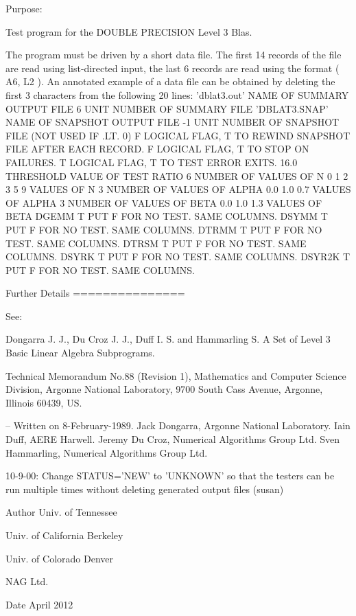 \begin{DoxyParagraph}{Purpose\+: }
\begin{DoxyVerb} Test program for the DOUBLE PRECISION Level 3 Blas.

 The program must be driven by a short data file. The first 14 records
 of the file are read using list-directed input, the last 6 records
 are read using the format ( A6, L2 ). An annotated example of a data
 file can be obtained by deleting the first 3 characters from the
 following 20 lines:
 'dblat3.out'      NAME OF SUMMARY OUTPUT FILE
 6                 UNIT NUMBER OF SUMMARY FILE
 'DBLAT3.SNAP'     NAME OF SNAPSHOT OUTPUT FILE
 -1                UNIT NUMBER OF SNAPSHOT FILE (NOT USED IF .LT. 0)
 F        LOGICAL FLAG, T TO REWIND SNAPSHOT FILE AFTER EACH RECORD.
 F        LOGICAL FLAG, T TO STOP ON FAILURES.
 T        LOGICAL FLAG, T TO TEST ERROR EXITS.
 16.0     THRESHOLD VALUE OF TEST RATIO
 6                 NUMBER OF VALUES OF N
 0 1 2 3 5 9       VALUES OF N
 3                 NUMBER OF VALUES OF ALPHA
 0.0 1.0 0.7       VALUES OF ALPHA
 3                 NUMBER OF VALUES OF BETA
 0.0 1.0 1.3       VALUES OF BETA
 DGEMM  T PUT F FOR NO TEST. SAME COLUMNS.
 DSYMM  T PUT F FOR NO TEST. SAME COLUMNS.
 DTRMM  T PUT F FOR NO TEST. SAME COLUMNS.
 DTRSM  T PUT F FOR NO TEST. SAME COLUMNS.
 DSYRK  T PUT F FOR NO TEST. SAME COLUMNS.
 DSYR2K T PUT F FOR NO TEST. SAME COLUMNS.

 Further Details
 ===============

 See:

    Dongarra J. J., Du Croz J. J., Duff I. S. and Hammarling S.
    A Set of Level 3 Basic Linear Algebra Subprograms.

    Technical Memorandum No.88 (Revision 1), Mathematics and
    Computer Science Division, Argonne National Laboratory, 9700
    South Cass Avenue, Argonne, Illinois 60439, US.

 -- Written on 8-February-1989.
    Jack Dongarra, Argonne National Laboratory.
    Iain Duff, AERE Harwell.
    Jeremy Du Croz, Numerical Algorithms Group Ltd.
    Sven Hammarling, Numerical Algorithms Group Ltd.

    10-9-00:  Change STATUS='NEW' to 'UNKNOWN' so that the testers
              can be run multiple times without deleting generated
              output files (susan)\end{DoxyVerb}
 
\end{DoxyParagraph}
\begin{DoxyAuthor}{Author}
Univ. of Tennessee 

Univ. of California Berkeley 

Univ. of Colorado Denver 

N\+A\+G Ltd. 
\end{DoxyAuthor}
\begin{DoxyDate}{Date}
April 2012 
\end{DoxyDate}
